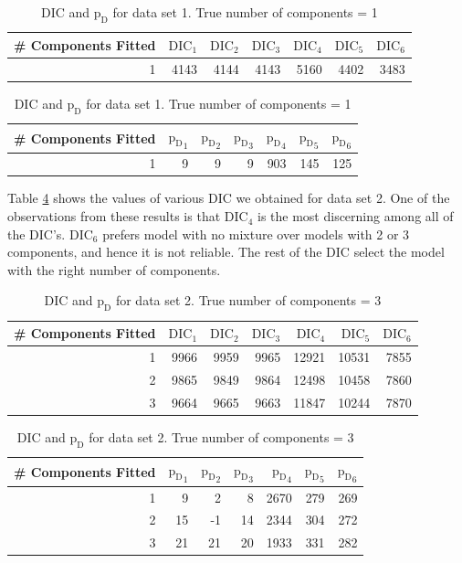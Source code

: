 \begin{table}[!htb]
\centering
\captionsetup{justification=centering}
\caption{DIC and $\text{p}_\text{D}$ for data set 1. True number of components = 1}
\label{table : ds_simple_dic} 
\begin{tabular}{@{}rrrrrrr@{}}
\toprule
\# Components Fitted & $\text{DIC}_1$ & $\text{DIC}_2$  & $\text{DIC}_3$  & $\text{DIC}_4$  & $\text{DIC}_5$  & $\text{DIC}_6$  \\ \midrule
1      & 4143 & 4144 & 4143 & 5160 & 4402 & 3483 \\
\bottomrule
\end{tabular}

\begin{tabular}{@{}rrrrrrr@{}}
\toprule
\# Components Fitted & ${\text{p}_\text{D}}_1$ & ${\text{p}_\text{D}}_2$ & ${\text{p}_\text{D}}_3$ & ${\text{p}_\text{D}}_4$ & ${\text{p}_\text{D}}_5$ & ${\text{p}_\text{D}}_6$ \\ \midrule
1      & 9    & 9    & 9    & 903  & 145  & 125  \\
\bottomrule
\end{tabular}
\end{table}

Table \ref{table : ds_3wellsep_dic} shows the values of various DIC we obtained for data set 2. One of the observations from these results is that $\text{DIC}_4$ is the most discerning among all of the DIC's. $\text{DIC}_6$ prefers model with no mixture over models with 2 or 3 components, and hence it is not reliable. The rest of the DIC select the model with the right number of components.\\

\begin{table}[!htb]
\centering
\captionsetup{justification=centering}
\caption{DIC and $\text{p}_\text{D}$ for data set 2. True number of components = 3}
\label{table : ds_3wellsep_dic} 
\begin{tabular}{@{}rrrrrrr@{}}
\toprule
\# Components Fitted & $\text{DIC}_1$ & $\text{DIC}_2$  & $\text{DIC}_3$  & $\text{DIC}_4$  & $\text{DIC}_5$  & $\text{DIC}_6$  \\ \midrule
1 & 9966 & 9959 & 9965 & 12921 & 10531 & 7855 \\
2 & 9865 & 9849 & 9864 & 12498 & 10458 & 7860 \\
3 & 9664 & 9665 & 9663 & 11847 & 10244 & 7870 \\
\bottomrule
\end{tabular}

\begin{tabular}{@{}rrrrrrr@{}}
\toprule
\# Components Fitted & ${\text{p}_\text{D}}_1$ & ${\text{p}_\text{D}}_2$ & ${\text{p}_\text{D}}_3$ & ${\text{p}_\text{D}}_4$ & ${\text{p}_\text{D}}_5$ & ${\text{p}_\text{D}}_6$ \\ \midrule
1 & 9 & 2 & 8 & 2670 & 279 & 269 \\
2 & 15 & -1 & 14 & 2344 & 304 & 272 \\
3 & 21 & 21 & 20 & 1933 & 331 & 282 \\
\bottomrule
\end{tabular}
\end{table}

